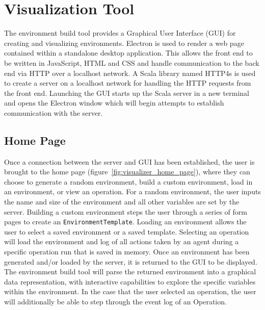 \section{Visualization Tool} \label{sec:visualization_tool}
The environment build tool provides a Graphical User Interface (GUI) for creating and visualizing environments.
Electron  is used to render a web page contained within a standalone desktop application.
This allows the front end to be written in JavaScript, HTML and CSS and handle communication to the back end via HTTP over a localhost network.
A Scala library named HTTP4s  is used to create a server on a localhost network for handling the HTTP requests from the front end.
Launching the GUI starts up the Scala server in a new terminal and opens the Electron window which will begin attempts to establish communication with the server.


\subsection{Home Page} \label{subsec:home_page}
Once a connection between the server and GUI has been established, the user is brought to the home page (figure~\ref{fig:visualizer_home_page}), where they can choose to generate a random environment, build a custom environment, load in an environment, or view an operation.
For a random environment, the user inputs the name and size of the environment and all other variables are set by the server.
Building a custom environment steps the user through a series of form pages to create an \texttt{EnvironmentTemplate}.
Loading an environment allows the user to select a saved environment or a saved template.
Selecting an operation will load the environment and log of all actions taken by an agent during a specific operation run that is saved in memory.
Once an environment has been generated and/or loaded by the server, it is returned to the GUI to be displayed.
The environment build tool will parse the returned environment into a graphical data representation, with interactive capabilities to explore the specific variables within the environment.
In the case that the user selected an operation, the user will additionally be able to step through the event log of an Operation.


